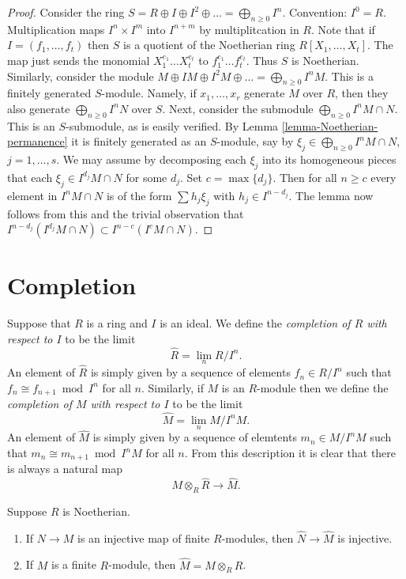 \begin{proof}
Consider the ring $S = R \oplus I \oplus I^2 \oplus \ldots
= \bigoplus_{n \geq 0} I^n$. Convention: $I^0 = R$.
Multiplication maps $I^n \times I^m$
into $I^{n+m}$ by multiplitcation in $R$.
Note that if $I = (f_1, \ldots, f_t)$
then $S$ is a quotient of the Noetherian ring $R[X_1,\ldots,X_t]$.
The map just sends the monomial $X_1^{e_1}\ldots X_t^{e_t}$
to $f_1^{e_1}\ldots f_t^{e_t}$. Thus $S$ is Noetherian. 
Similarly, consider the module $M \oplus IM \oplus I^2M \oplus \ldots
= \bigoplus_{n \geq 0} I^nM$. This is a finitely generated $S$-module.
Namely, if $x_1,\ldots,x_r$ generate $M$ over $R$, then they also generate
$\bigoplus_{n \geq 0} I^nN$ over $S$. Next, consider the
submodule $\bigoplus_{n \geq 0} I^nM \cap N$.
This is an $S$-submodule, as is easily verified. By
Lemma \ref{lemma-Noetherian-permanence} it is finitely generated as
an $S$-module,
say by $\xi_j \in \bigoplus_{n \geq 0} I^nM \cap N$, $j = 1,\ldots,s$.
We may assume by decomposing each $\xi_j$ into its homogeneous
pieces that each $\xi_j \in I^{d_j}M \cap N$ for some $d_j$.
Set $c = \max\{d_j\}$. Then for all $n \geq c$ every element
in $I^nM \cap N$ is of the form $\sum h_j \xi_j$ with
$h_j \in I^{n - d_j}$. The lemma now follows from this and the trivial 
observation that $I^{n-d_j}(I^{d_j}M \cap N) \subset I^{n-c}(I^cM \cap N)$.
\end{proof}

\section{Completion}
\label{section-completion}

\noindent
Suppose that $R$ is a ring and $I$ is an ideal.
We define the {\it completion of $R$ with respect to $I$}
to be the limit
$$
\hat R = \lim_{n} R/I^n.
$$
An element of $\hat R$ is simply given by a sequence
of elements $f_n \in R/I^n$ such that $f_n \cong f_{n+1} \bmod I^n$
for all $n$. Similarly, if $M$ is an $R$-module then we define the
{\it completion of $M$ with respect to $I$}
to be the limit
$$
\hat M = \lim_{n} M/I^nM.
$$
An element of $\hat M$ is simply given by a sequence of
elemtents $m_n \in M/I^nM$ such that $m_n \cong m_{n+1} \bmod I^nM$
for all $n$. From this description it is clear that there 
is always a natural map
$$
M \otimes_R \hat R
\longrightarrow
\hat M.
$$

\begin{lemma}
\label{lemma-completion-tensor}
Suppose $R$ is Noetherian.
\begin{enumerate}
\item If $N \to M$ is an injective map of finite $R$-modules,
then $\hat N \to \hat M$ is injective.
\item If $M$ is a finite $R$-module, then $\hat M = M \otimes_R \hat R$.
\end{enumerate}
\end{lemma}

